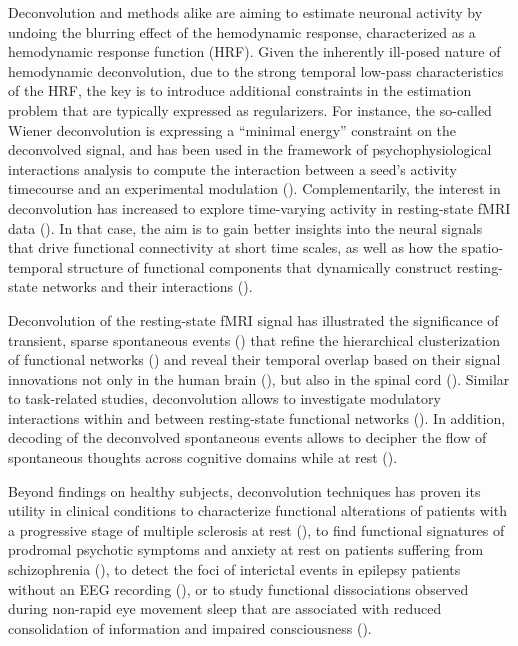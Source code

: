 Deconvolution and methods alike are aiming to estimate neuronal activity by undoing the blurring effect of the hemodynamic response, characterized as a hemodynamic response function (HRF). Given the inherently ill-posed nature of hemodynamic deconvolution, due to the strong temporal low-pass characteristics of the HRF, the key is to introduce additional constraints in the estimation problem that are typically expressed as regularizers. For instance, the so-called Wiener deconvolution is expressing a ``minimal energy'' constraint on the deconvolved signal, and has been used in the framework of psychophysiological interactions analysis to compute the interaction between a seed's activity timecourse and an experimental modulation (\citealt{glover1999deconvolution,gitelman2003ModelingRegionalPsychophysiologic,Di2019,Gerchen2014,Freitas2020}). Complementarily, the interest in deconvolution has increased to explore time-varying activity in resting-state fMRI data (\citealt{Bolton2020,Preti2017,Keilholz2017,Lurie2020}). In that case, the aim is to gain better insights into the neural signals that drive functional connectivity at short time scales, as well as how the spatio-temporal structure of functional components that dynamically construct resting-state networks and their interactions (\citealt{karahanoglu2017DynamicsLargescalefMRI}).

Deconvolution of the resting-state fMRI signal has illustrated the significance of transient, sparse spontaneous events (\citealt{petridou2013PeriodsRestfMRI,allan2015FunctionalConnectivityMRI}) that refine the hierarchical clusterization of functional networks (\citealt{karahanoglu2013TotalActivationfMRI}) and reveal their temporal overlap based on their signal innovations not only in the human brain (\citealt{karahanoglu2015TransientBrainActivity}), but also in the spinal cord (\citealt{kinany2020DynamicFunctionalConnectivity}). Similar to task-related studies, deconvolution allows to investigate modulatory interactions within and between resting-state functional networks (\citealt{Di2013,Di2015}). In addition, decoding of the deconvolved spontaneous events allows to decipher the flow of spontaneous thoughts across cognitive domains while at rest (\citealt{gonzalez-castillo2019ImagingSpontaneousFlow,karahanoglu2015TransientBrainActivity}).

Beyond findings on healthy subjects, deconvolution techniques has proven its utility in clinical conditions to characterize functional alterations of patients with a progressive stage of multiple sclerosis at rest (\citealt{bommarito2020FunctionalNetworkDynamicsa}), to find functional signatures of prodromal psychotic symptoms and anxiety at rest on patients suffering from schizophrenia (\citealt{zoller2019LargeScaleBrainNetwork}), to detect the foci of interictal events in epilepsy patients without an EEG recording (\citealt{lopes2012DetectionEpilepticActivity,karahanouglu2013spatial}), or to study functional dissociations observed during non-rapid eye movement sleep that are associated with reduced consolidation of information and impaired consciousness (\citealt{tarun2021NREMSleepStagesa}).

